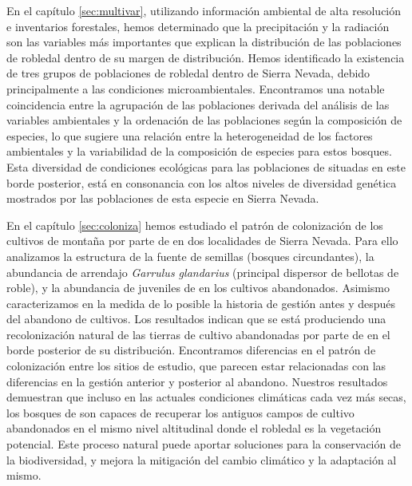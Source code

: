 En el \textcolor{ctcolormain}{capítulo \ref{sec:multivar}}, utilizando información ambiental de alta resolución e inventarios forestales, hemos determinado que la precipitación y la radiación son las variables más importantes que explican la distribución de las poblaciones de robledal dentro de su margen de distribución. Hemos identificado la existencia de tres grupos de poblaciones de robledal dentro de Sierra Nevada, debido principalmente a las condiciones microambientales. Encontramos una notable coincidencia entre la agrupación de las poblaciones derivada del análisis de las variables ambientales y la ordenación de las poblaciones según la composición de especies, lo que sugiere una relación entre la heterogeneidad de los factores ambientales y la variabilidad de la composición de especies para estos bosques. Esta diversidad de condiciones ecológicas para las poblaciones de \Qp situadas en este borde posterior, está en consonancia con los altos niveles de diversidad genética mostrados por las poblaciones de esta especie en Sierra Nevada. 

En el \textcolor{ctcolormain}{capítulo \ref{sec:coloniza}} hemos estudiado el patrón de colonización de los cultivos de montaña por parte de \Qp en dos localidades de Sierra Nevada. Para ello analizamos la estructura de la fuente de semillas (bosques circundantes), la abundancia de arrendajo \emph{Garrulus glandarius} (principal dispersor de bellotas de roble), y la abundancia de juveniles de \Qp en los cultivos abandonados. Asimismo caracterizamos en la medida de lo posible la historia de gestión antes y después del abandono de cultivos. Los resultados indican que se está produciendo una recolonización natural de las tierras de cultivo abandonadas por parte de \Qp en el borde posterior de su distribución. Encontramos diferencias en el patrón de colonización entre los sitios de estudio, que parecen estar relacionadas con las diferencias en la gestión anterior y posterior al abandono. Nuestros resultados demuestran que incluso en las actuales condiciones climáticas cada vez más secas, los bosques de \Qp son capaces de recuperar los antiguos campos de cultivo abandonados en el mismo nivel altitudinal donde el robledal es la vegetación potencial. Este proceso natural puede aportar soluciones para la conservación de la biodiversidad, y mejora la mitigación del cambio climático y la adaptación al mismo. 

